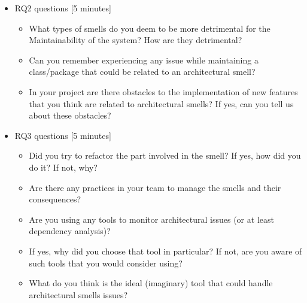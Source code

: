 \begin{itemize}
    \item RQ2 questions [5 minutes]
    \begin{itemize}
        \item What types of smells do you deem to be more detrimental for the Maintainability of the system? How are they detrimental?
        \item Can you remember experiencing any issue while maintaining a class/package that could be related to an architectural smell?
        \item In your project are there  obstacles to the implementation of new features that you think are related to architectural smells? If yes, can you tell us about these obstacles?
    \end{itemize}

    \item RQ3 questions [5 minutes]
    \begin{itemize}
        \item Did you try to refactor the part involved in the smell? If yes, how did you do it? If not, why?
        \item Are there any practices in your team to manage the smells and their consequences?
        \item Are you using any tools to monitor architectural issues (or at least dependency analysis)? 
        \item If yes, why did you choose that tool in particular? If not, are you aware of such tools that you would consider using? 
        \item What do you think is the ideal (imaginary) tool that could handle architectural smells issues?
    \end{itemize}
\end{itemize}

